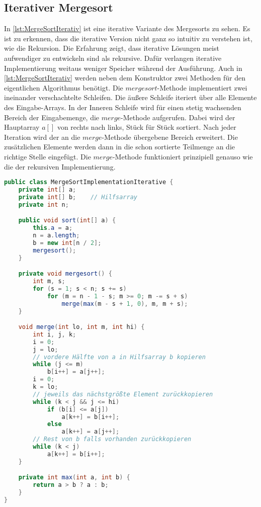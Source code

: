 \subsection{Iterativer Mergesort}

In \autoref{lst:MergeSortIterativ} ist eine iterative Variante des Mergesorts zu sehen. Es ist zu erkennen, dass die iterative Version nicht ganz so intuitiv zu verstehen ist, wie die Rekursion. Die Erfahrung zeigt, dass iterative Lösungen meist aufwendiger zu entwickeln sind als rekursive. Dafür verlangen iterative Implementierung weitaus weniger Speicher während der Ausführung. Auch in \autoref{lst:MergeSortIterativ} werden neben dem Konstruktor zwei Methoden für den eigentlichen Algorithmus benötigt. Die $mergesort$-Methode implementiert zwei ineinander verschachtelte Schleifen. Die äußere Schleife iteriert über alle Elemente des Eingabe-Arrays. In der Inneren Schleife wird für einen stetig wachsenden Bereich der Eingabemenge, die $merge$-Methode aufgerufen. Dabei wird der Hauptarray $a[]$ von rechts nach links, Stück für Stück sortiert. Nach jeder Iteration wird der an  die $merge$-Methode übergebene Bereich erweitert. Die zusätzlichen Elemente werden dann in die schon sortierte Teilmenge an die richtige Stelle eingefügt. Die $merge$-Methode funktioniert prinzipiell genauso wie die der rekursiven Implementierung.

\begin{lstlisting}[language=java,caption={iterativer Mergesort (Quelle: \cite{MergeSortIterativ})},label=lst:MergeSortIterativ]
public class MergeSortImplementationIterative {
    private int[] a;
    private int[] b;    // Hilfsarray
    private int n;

    public void sort(int[] a) {
        this.a = a;
        n = a.length;
        b = new int[n / 2];
        mergesort();
    }

    private void mergesort() {
        int m, s;
        for (s = 1; s < n; s += s)
            for (m = n - 1 - s; m >= 0; m -= s + s)
                merge(max(m - s + 1, 0), m, m + s);
    }

    void merge(int lo, int m, int hi) {
        int i, j, k;
        i = 0;
        j = lo;
        // vordere Hälfte von a in Hilfsarray b kopieren
        while (j <= m)
            b[i++] = a[j++];
        i = 0;
        k = lo;
        // jeweils das nächstgrößte Element zurückkopieren
        while (k < j && j <= hi)
            if (b[i] <= a[j])
                a[k++] = b[i++];
            else
                a[k++] = a[j++];
        // Rest von b falls vorhanden zurückkopieren
        while (k < j)
            a[k++] = b[i++];
    }

    private int max(int a, int b) {
        return a > b ? a : b;
    }
}
\end{lstlisting}
